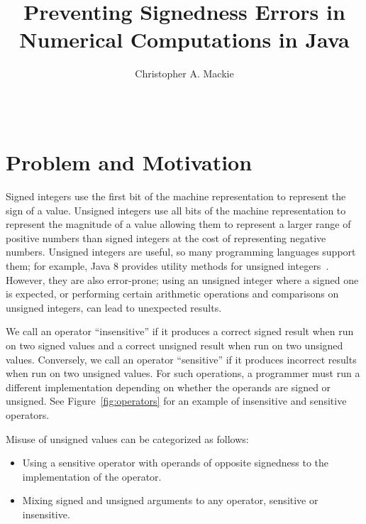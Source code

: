 \documentclass{sig-alternate-05-2015}
\begin{document}
\setlength{\pdfpageheight}{\paperheight}
\setlength{\pdfpagewidth}{\paperwidth}

\title{Preventing Signedness Errors in Numerical Computations in Java}

\author{
Christopher A. Mackie\\
       \\
       \\
}

\maketitle

\section{Problem and Motivation}

Signed integers use the first bit of the machine representation to
represent the sign of a value.  Unsigned integers use all
bits of the machine representation to represent the magnitude of a value allowing them to
represent a larger range of positive numbers than signed integers at the cost of
representing negative numbers.
Unsigned integers are useful, so many programming languages support them;
for example, Java 8 provides utility methods for unsigned
integers~\cite{JDK8UnsignedIntegerArithmetic2012}.  However, they are also
error-prone; using an unsigned integer where a signed
one is expected, or performing certain arithmetic operations and
comparisons on unsigned integers, can lead to unexpected results.

We call an operator ``insensitive'' if it produces a correct signed result
when run on two signed values and a correct unsigned result
when run on two unsigned values. Conversely, we call an operator ``sensitive'' if it
produces incorrect results when run on two unsigned values.  For such
operations, a programmer must run a different implementation depending on whether
the operands are signed or unsigned.  See Figure~\ref{fig:operators} for
an example of insensitive and sensitive operators.

Misuse of unsigned values can be categorized as follows:

\begin{itemize}\itemsep 0pt \parskip 0pt
  \item Using a sensitive operator with operands of opposite signedness to the implementation of the operator.
  \item Mixing signed and unsigned arguments to any operator, sensitive or insensitive.
\end{itemize}
\end{document}
